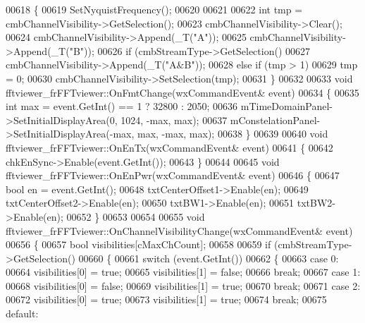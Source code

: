 \begin{DoxyCode}
{{{{{{{00618 \{
00619     SetNyquistFrequency();
00620 
00621 
00622     \textcolor{keywordtype}{int} tmp = cmbChannelVisibility->GetSelection();
00623     cmbChannelVisibility->Clear();
00624     cmbChannelVisibility->Append(\_T(\textcolor{stringliteral}{"A"}));
00625     cmbChannelVisibility->Append(\_T(\textcolor{stringliteral}{"B"}));
00626     \textcolor{keywordflow}{if} (cmbStreamType->GetSelection()%
00627         cmbChannelVisibility->Append(\_T(\textcolor{stringliteral}{"A&B"}));
00628     \textcolor{keywordflow}{else} \textcolor{keywordflow}{if} (tmp > 1)
00629         tmp = 0;
00630     cmbChannelVisibility->SetSelection(tmp);
00631 \}
00632 
00633 \textcolor{keywordtype}{void} fftviewer_frFFTviewer::OnFmtChange(wxCommandEvent& event)
00634 \{
00635     \textcolor{keywordtype}{int} max = \textcolor{keyword}{event}.GetInt() == 1 ? 32800 : 2050;
00636     mTimeDomainPanel->SetInitialDisplayArea(0, 1024, -max, max);
00637     mConstelationPanel->SetInitialDisplayArea(-max, max, -max, max);
00638 \}
00639 
00640 \textcolor{keywordtype}{void} fftviewer_frFFTviewer::OnEnTx(wxCommandEvent& event)
00641 \{
00642     chkEnSync->Enable(event.GetInt());
00643 \}
00644 
00645 \textcolor{keywordtype}{void} fftviewer_frFFTviewer::OnEnPwr(wxCommandEvent& event)
00646 \{
00647     \textcolor{keywordtype}{bool} en = \textcolor{keyword}{event}.GetInt();
00648     txtCenterOffset1->Enable(en);
00649     txtCenterOffset2->Enable(en);
00650     txtBW1->Enable(en);
00651     txtBW2->Enable(en);
00652 \}
00653 
00654 
00655 \textcolor{keywordtype}{void} fftviewer_frFFTviewer::OnChannelVisibilityChange(wxCommandEvent& event)
00656 \{
00657     \textcolor{keywordtype}{bool} visibilities[cMaxChCount];
00658 
00659     \textcolor{keywordflow}{if} (cmbStreamType->GetSelection()%
00660     \{
00661         \textcolor{keywordflow}{switch} (event.GetInt())
00662         \{
00663         \textcolor{keywordflow}{case} 0:
00664             visibilities[0] = \textcolor{keyword}{true};
00665             visibilities[1] = \textcolor{keyword}{false};
00666             \textcolor{keywordflow}{break};
00667         \textcolor{keywordflow}{case} 1:
00668             visibilities[0] = \textcolor{keyword}{false};
00669             visibilities[1] = \textcolor{keyword}{true};
00670             \textcolor{keywordflow}{break};
00671         \textcolor{keywordflow}{case} 2:
00672             visibilities[0] = \textcolor{keyword}{true};
00673             visibilities[1] = \textcolor{keyword}{true};
00674             \textcolor{keywordflow}{break};
00675         \textcolor{keywordflow}{default}:
}}}}}}}
\end{DoxyCode}
